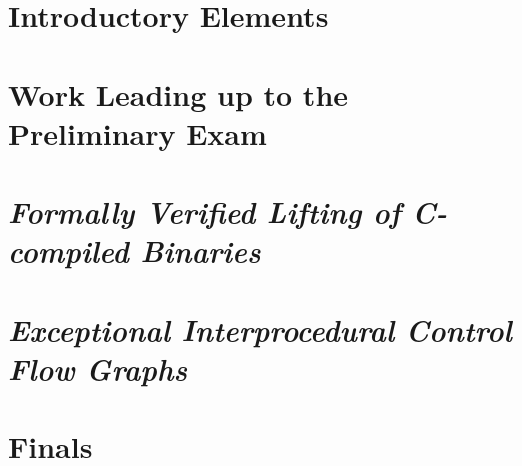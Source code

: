 \documentclass[pageskip]{VTthesis}
\begin{document}
  \frontmatter %

  \tableofcontents
  \listofalgorithms
  \listoffigures
  \lstlistoflistings
  \listoftables
  \listoftheorems

  \printacronyms[heading=chapter]
  \printunsrtglossary[type=symbols,style=indexgroup] %
  \acresetall %


  \mainmatter %

  \part{Introductory Elements}
  
  
  
  

  \part{Work Leading up to the Preliminary Exam}
  
  

  \part{\emph{Formally Verified Lifting of C-compiled  Binaries}}
  
  
  
  

  \part{\emph{Exceptional Interprocedural Control Flow Graphs}}
  
  
  

  \part{Finals}
  
\end{document}
